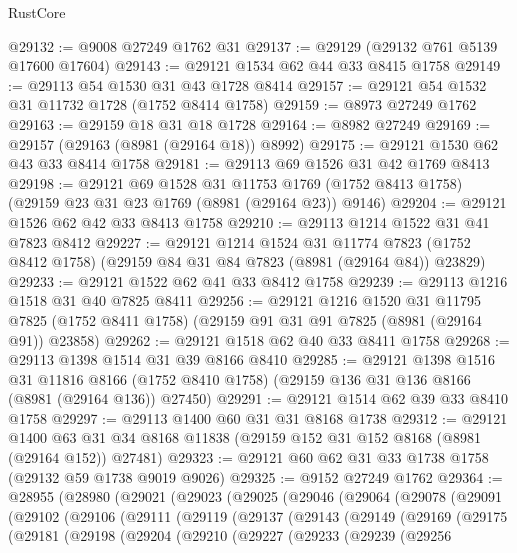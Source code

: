 \begin{lexlean}{RustCore}
\begin{coremodule}
@29132 := @9008 @27249 @1762 @31
@29137 := @29129 (@29132 @761 @5139 @17600 @17604)
@29143 := @29121 @1534 @62 @44 @33 @8415 @1758
@29149 := @29113 @54 @1530 @31 @43 @1728 @8414
@29157 := @29121 @54 @1532 @31 @11732 @1728 (@1752 @8414 @1758)
@29159 := @8973 @27249 @1762
@29163 := @29159 @18 @31 @18 @1728
@29164 := @8982 @27249
@29169 := @29157 (@29163 (@8981 (@29164 @18)) @8992)
@29175 := @29121 @1530 @62 @43 @33 @8414 @1758
@29181 := @29113 @69 @1526 @31 @42 @1769 @8413
@29198 := @29121
    @69
    @1528
    @31
    @11753
    @1769
    (@1752 @8413 @1758)
    (@29159 @23 @31 @23 @1769 (@8981 (@29164 @23)) @9146)
@29204 := @29121 @1526 @62 @42 @33 @8413 @1758
@29210 := @29113 @1214 @1522 @31 @41 @7823 @8412
@29227 := @29121
    @1214
    @1524
    @31
    @11774
    @7823
    (@1752 @8412 @1758)
    (@29159 @84 @31 @84 @7823 (@8981 (@29164 @84)) @23829)
@29233 := @29121 @1522 @62 @41 @33 @8412 @1758
@29239 := @29113 @1216 @1518 @31 @40 @7825 @8411
@29256 := @29121
    @1216
    @1520
    @31
    @11795
    @7825
    (@1752 @8411 @1758)
    (@29159 @91 @31 @91 @7825 (@8981 (@29164 @91)) @23858)
@29262 := @29121 @1518 @62 @40 @33 @8411 @1758
@29268 := @29113 @1398 @1514 @31 @39 @8166 @8410
@29285 := @29121
    @1398
    @1516
    @31
    @11816
    @8166
    (@1752 @8410 @1758)
    (@29159 @136 @31 @136 @8166 (@8981 (@29164 @136)) @27450)
@29291 := @29121 @1514 @62 @39 @33 @8410 @1758
@29297 := @29113 @1400 @60 @31 @31 @8168 @1738
@29312 := @29121
    @1400
    @63
    @31
    @34
    @8168
    @11838
    (@29159 @152 @31 @152 @8168 (@8981 (@29164 @152)) @27481)
@29323 := @29121 @60 @62 @31 @33 @1738 @1758 (@29132 @59 @1738 @9019 @9026)
@29325 := @9152 @27249 @1762
@29364 := @28955
    (@28980
      (@29021
        (@29023
          (@29025
            (@29046
              (@29064
                (@29078
                  (@29091
                    (@29102
                      (@29106
                        (@29111
                          (@29119
                            (@29137
                              (@29143
                                (@29149
                                  (@29169
                                    (@29175
                                      (@29181
                                        (@29198
                                          (@29204
                                            (@29210
                                              (@29227
                                                (@29233
                                                  (@29239
                                                    (@29256

\end{coremodule}
\end{lexlean}

